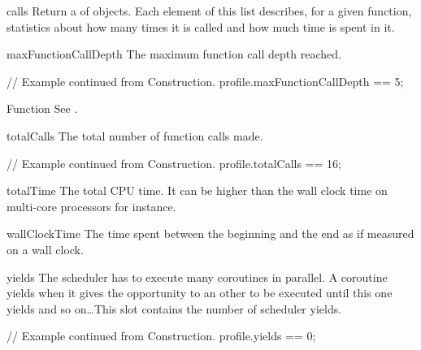 \begin{urbiscriptapi}

\item[calls]%
  Return a  of  objects. Each
  element of this list describes, for a given function, statistics about how
  many times it is called and how much time is spent in it.

\item[maxFunctionCallDepth]%
  The maximum function call depth reached.
\begin{urbiassert}
// Example continued from Construction.
profile.maxFunctionCallDepth == 5;
\end{urbiassert}

\item[Function] See .

\item[totalCalls]%
  The total number of function calls made.
\begin{urbiassert}
// Example continued from Construction.
profile.totalCalls == 16;
\end{urbiassert}

\item[totalTime]%
  The total CPU time. It can be higher than the wall clock time on
  multi-core processors for instance.

\item[wallClockTime]%
  The time spent between the beginning and the end as if measured on a wall
  clock.

\item[yields]%
  The scheduler has to execute many coroutines in parallel. A coroutine
  yields when it gives the opportunity to an other to be executed until this
  one yields and so on\dots This slot contains the number of scheduler
  yields.
\begin{urbiassert}
// Example continued from Construction.
profile.yields == 0;
\end{urbiassert}
\end{urbiscriptapi}


